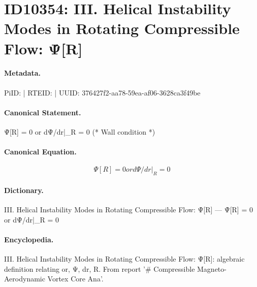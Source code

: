 \section*{ID10354: III. Helical Instability Modes in Rotating Compressible Flow: Ψ̂[R]}
\paragraph{Metadata.}
PiID:  | RTEID:  | UUID: 376427f2-aa78-59ea-af06-3628ca3f49be

\paragraph{Canonical Statement.}
Ψ̂[R] = 0 or dΨ̂/dr|\_R = 0 (* Wall condition *)

\paragraph{Canonical Equation.}
\[
Ψ̂[R] = 0 or dΨ̂/dr|_R = 0
\]

\paragraph{Dictionary.}
III. Helical Instability Modes in Rotating Compressible Flow: Ψ̂[R] — Ψ̂[R] = 0 or dΨ̂/dr|\_R = 0

\paragraph{Encyclopedia.}
III. Helical Instability Modes in Rotating Compressible Flow: Ψ̂[R]: algebraic definition relating or, Ψ, dr, R. From report '\# Compressible Magneto-Aerodynamic Vortex Core Ana'.
